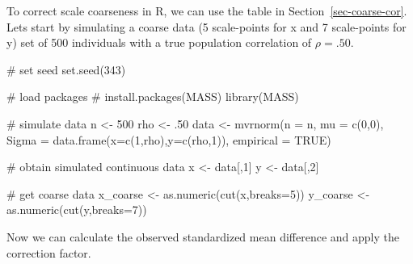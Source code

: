 \documentclass[
  letterpaper,
  DIV=11,
  numbers=noendperiod]{scrreprt}
\newenvironment{Shaded}{\begin{snugshade}}{\end{snugshade}}
\newcommand{\AttributeTok}[1]{\textcolor[rgb]{0.40,0.45,0.13}{#1}}
\newcommand{\CommentTok}[1]{\textcolor[rgb]{0.37,0.37,0.37}{#1}}
\newcommand{\ConstantTok}[1]{\textcolor[rgb]{0.56,0.35,0.01}{#1}}
\newcommand{\DecValTok}[1]{\textcolor[rgb]{0.68,0.00,0.00}{#1}}
\newcommand{\FunctionTok}[1]{\textcolor[rgb]{0.28,0.35,0.67}{#1}}
\newcommand{\NormalTok}[1]{\textcolor[rgb]{0.00,0.23,0.31}{#1}}
\newcommand{\OtherTok}[1]{\textcolor[rgb]{0.00,0.23,0.31}{#1}}
\begin{document}
To correct scale coarseness in R, we can use the table in
Section~\ref{sec-coarse-cor}. Lets start by simulating a coarse data (5
scale-points for x and 7 scale-points for y) set of 500 individuals with
a true population correlation of \(\rho = .50\).

\begin{Shaded}
\begin{Highlighting}[]
\CommentTok{\# set seed}
\FunctionTok{set.seed}\NormalTok{(}\DecValTok{343}\NormalTok{)}

\CommentTok{\# load packages}
\CommentTok{\# install.packages(\textquotesingle{}MASS\textquotesingle{})}
\FunctionTok{library}\NormalTok{(MASS)}

\CommentTok{\# simulate data}
\NormalTok{n }\OtherTok{\textless{}{-}} \DecValTok{500}
\NormalTok{rho }\OtherTok{\textless{}{-}}\NormalTok{ .}\DecValTok{50}
\NormalTok{data }\OtherTok{\textless{}{-}} \FunctionTok{mvrnorm}\NormalTok{(}\AttributeTok{n =}\NormalTok{ n,}
                \AttributeTok{mu =} \FunctionTok{c}\NormalTok{(}\DecValTok{0}\NormalTok{,}\DecValTok{0}\NormalTok{),}
                \AttributeTok{Sigma =} \FunctionTok{data.frame}\NormalTok{(}\AttributeTok{x=}\FunctionTok{c}\NormalTok{(}\DecValTok{1}\NormalTok{,rho),}\AttributeTok{y=}\FunctionTok{c}\NormalTok{(rho,}\DecValTok{1}\NormalTok{)),}
                \AttributeTok{empirical =} \ConstantTok{TRUE}\NormalTok{)}

\CommentTok{\# obtain simulated continuous data}
\NormalTok{x }\OtherTok{\textless{}{-}}\NormalTok{ data[,}\DecValTok{1}\NormalTok{]}
\NormalTok{y }\OtherTok{\textless{}{-}}\NormalTok{ data[,}\DecValTok{2}\NormalTok{]}

\CommentTok{\# get coarse data}
\NormalTok{x\_coarse }\OtherTok{\textless{}{-}} \FunctionTok{as.numeric}\NormalTok{(}\FunctionTok{cut}\NormalTok{(x,}\AttributeTok{breaks=}\DecValTok{5}\NormalTok{)) }
\NormalTok{y\_coarse }\OtherTok{\textless{}{-}} \FunctionTok{as.numeric}\NormalTok{(}\FunctionTok{cut}\NormalTok{(y,}\AttributeTok{breaks=}\DecValTok{7}\NormalTok{)) }
\end{Highlighting}
\end{Shaded}

Now we can calculate the observed standardized mean difference and apply
the correction factor.
\end{document}
